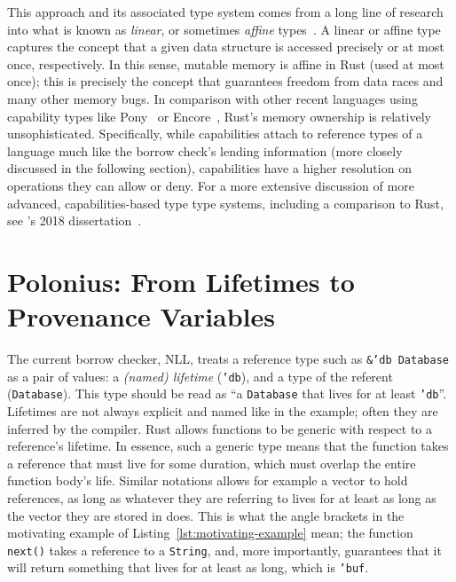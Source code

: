 \documentclass[11pt,a4paper,twoside,openany]{report}
\newcommand{\InRust}[1]{\texttt{#1}}
\renewcommand\_{\textunderscore\allowbreak}
\begin{document}
This approach and its associated type system comes from a long line of research
into what is known as \textit{linear}, or sometimes \textit{affine}
types~\cite{wadler1990linear}. A linear or affine type captures the concept that
a given data structure is accessed precisely or at most once, respectively. In
this sense, mutable memory is affine in Rust (used at most once); this is
precisely the concept that guarantees freedom from data races and many other
memory bugs. In comparison with other recent languages using capability types
like Pony~\cite{clebsch2015pony, Clebsch:2015:DCS:2824815.2824816} or
Encore~\cite{Brandauer2015}, Rust's memory ownership is relatively
unsophisticated. Specifically, while capabilities attach to reference types of a
language much like the borrow check's lending information (more closely
discussed in the following section), capabilities have a higher resolution on
operations they can allow or deny. For a more extensive discussion of more
advanced, capabilities-based type type systems, including a comparison to Rust,
see \citeauthor*{castegren2018capability}'s 2018
dissertation~\cite{castegren2018capability}.

\section{Polonius: From Lifetimes to Provenance
  Variables}\label{sec:reference-provenance}

The current borrow checker, NLL, treats a reference type such as
\InRust{&'db Database} as a pair of values: a \textit{(named) lifetime}
(\InRust{'db}), and a type of the referent (\InRust{Database}). This type should
be read as ``a \InRust{Database} that lives for at least \InRust{'db}''.
Lifetimes are not always explicit and named like in the example; often they are
inferred by the compiler. Rust allows functions to be generic with respect to a
reference's lifetime. In essence, such a generic type means that the function
takes a reference that must live for some duration, which must overlap the
entire function body's life. Similar notations allows for example a vector to
hold references, as long as whatever they are referring to lives for at least as
long as the vector they are stored in does. This is what the angle brackets in
the motivating example of Listing~\ref{lst:motivating-example} mean; the
function \InRust{next()} takes a reference to a \InRust{String}, and, more
importantly, guarantees that it will return something that lives for at least as
long, which is \InRust{'buf}.
\end{document}
